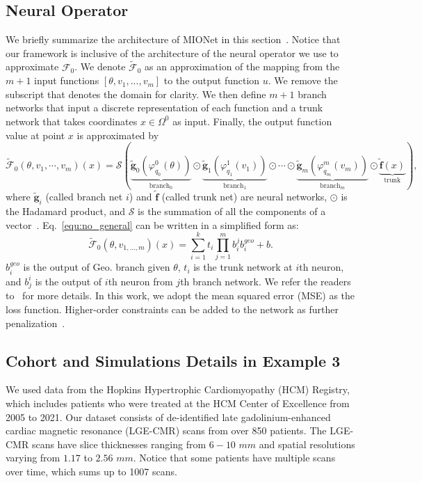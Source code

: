 \documentclass[review]{elsarticle}
\def\refd{0}
\def\Omegaref{{\Omega^\refd}}
\def\x{x}
\begin{document}
\subsection{Neural Operator} \label{subsec:NO}

We briefly summarize the architecture of MIONet in this section~\cite{jin2022mionet}. Notice that our framework is inclusive of the architecture of the neural operator we use to approximate $\mathcal{F}_{\refd}$. We denote $\tilde{\mathcal{F}}_{0}$ as an approximation of the mapping from the $m+1$ input functions $[\theta, v_{1},...,v_{m}]$ to the output function $u$. We remove the subscript that denotes the domain for clarity. We then define $m+1$ branch networks that input a discrete representation of each function and a trunk network that takes coordinates $\x  \in \Omegaref$ as input. Finally, the output function value at point $\x $ is approximated by
\begin{equation}\label{equ:no_general}
    \tilde{\mathcal{F}}_{0}(\theta,v_1,\cdots,v_m)(\x ) = \mathcal{S}\left( \underbrace{\tilde{\mathbf{g}}_0(\varphi_{q_0}^0(\theta))}_{\text{branch}_0} \odot \underbrace{\tilde{\mathbf{g}}_1(\varphi_{q_1}^1(v_1))}_{\text{branch}_1} \odot \cdots \odot \underbrace{\tilde{\mathbf{g}}_m(\varphi_{q_m}^m(v_m))}_{\text{branch}_m} \odot \underbrace{\tilde{\mathbf{f}}(\x )}_{\text{trunk}} \right),
\end{equation}
where $\tilde{\mathbf{g}}_i$ (called branch net $i$) and $\tilde{\mathbf{f}}$ (called trunk net) are neural networks, $\odot$ is the Hadamard product, and $\mathcal{S}$ is the summation of all the components of a vector~\cite{jin2022mionet}. Eq.~\eqref{equ:no_general} can be written in a simplified form as:
\begin{equation*}
    \tilde{\mathcal{F}}_{0}(\theta, v_{1,...,m})(\x ) = \sum^{k}_{i=1} t_{i}\prod^{m}_{j=1} b^{j}_{i}b^{geo}_{i} + b.
\end{equation*}
$b^{geo}_{i}$ is the output of Geo. branch given $\theta$, $t_{i}$ is the trunk network at $i$th neuron, and $b_{j}^{i}$ is the output of $i$th neuron from $j$th branch network. We refer the readers to~\cite{jin2022mionet,lu2021learning} for more details. In this work, we adopt the mean squared error (MSE) as the loss function. Higher-order constraints can be added to the network as further penalization~\cite{yin2022interfacing}. 

\subsection{Cohort and Simulations Details in Example 3}\label{subsec:cohort}
We used data from the Hopkins Hypertrophic Cardiomyopathy (HCM) Registry, which includes patients who were treated at the HCM Center of Excellence from 2005 to 2021. Our dataset consists of de-identiﬁed late gadolinium-enhanced cardiac magnetic resonance (LGE-CMR) scans from over 850 patients. The LGE-CMR scans have slice thicknesses ranging from $6-10$ $mm$ and spatial resolutions varying from $1.17$ to $2.56$ $mm$. Notice that some patients have multiple scans over time, which sums up to 1007 scans.
\end{document}
